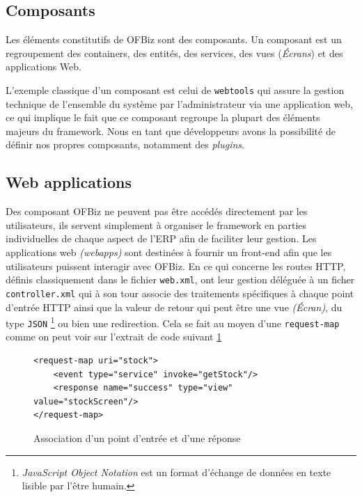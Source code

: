 \subsection{Composants}
Les éléments constitutifs de OFBiz sont des composants. Un composant est un regroupement des containers, des entités, des services, des vues (\emph{Écrans}) et des applications Web.


L'exemple classique d'un composant est celui de \verb|webtools| qui assure la gestion technique de l'ensemble du système par l'administrateur via une application web, ce qui implique le fait que ce composant regroupe la plupart des éléments majeurs du framework.
Nous en tant que développeurs avons la possibilité de définir nos propres composants, notamment des \emph{plugins}. 
  


\subsection{Web applications}
Des composant OFBiz ne peuvent pas être accédés directement par les utilisateurs, ils servent simplement à organiser le framework en parties individuelles de chaque aspect de l'ERP afin de faciliter leur gestion. Les applications web \emph{(webapps)} sont destinées à fournir un front-end afin que les utilisateurs puissent interagir avec OFBiz. En ce qui concerne les routes HTTP, définis classiquement dans le fichier \verb|web.xml|, ont leur gestion déléguée à un ficher \verb|controller.xml| qui à son tour associe des traitements spécifiques à chaque point d'entrée HTTP ainsi que la valeur de retour qui peut être une vue \emph{(Écran)}, du type \verb|JSON| \footnote{ \emph{JavaScript Object Notation} est un format d'échange de données en texte lisible par l'être humain. } ou bien une redirection. Cela se fait au moyen d'une \verb|request-map| comme on peut voir sur l'extrait de code suivant \ref{reqmap}



\lstset{language=XML}
\begin{figure}
\begin{lstlisting}[frame=leftline]
<request-map uri="stock">
    <event type="service" invoke="getStock"/>
    <response name="success" type="view" value="stockScreen"/>
</request-map>
\end{lstlisting}
	\caption{Association d'un point d'entrée et d'une réponse}
\label{reqmap}
\end{figure}




